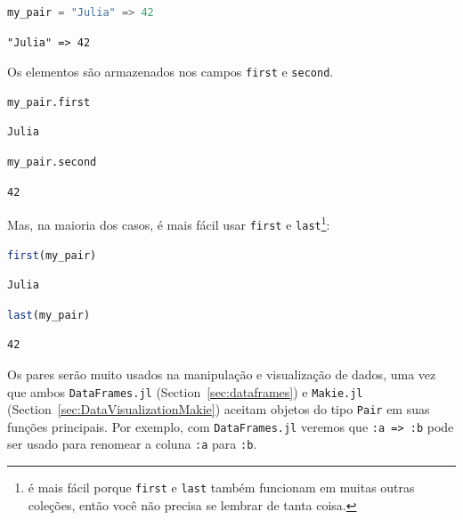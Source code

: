 \documentclass[
  notoc %
]{tufte-book}
\newcommand{\passthrough}[1]{#1}
\begin{document}
\begin{lstlisting}[language=Julia]
my_pair = "Julia" => 42
\end{lstlisting}

\begin{lstlisting}[language=Output]
"Julia" => 42
\end{lstlisting}

Os elementos são armazenados nos campos \passthrough{\lstinline!first!}
e \passthrough{\lstinline!second!}.

\begin{lstlisting}[language=Julia]
my_pair.first
\end{lstlisting}

\begin{lstlisting}[language=Output]
Julia
\end{lstlisting}

\begin{lstlisting}[language=Julia]
my_pair.second
\end{lstlisting}

\begin{lstlisting}[language=Output]
42
\end{lstlisting}

Mas, na maioria dos casos, é mais fácil usar
\passthrough{\lstinline!first!} e
\passthrough{\lstinline!last!}\footnote{é mais fácil porque
  \passthrough{\lstinline!first!} e \passthrough{\lstinline!last!}
  também funcionam em muitas outras coleções, então você não precisa se
  lembrar de tanta coisa.}:

\begin{lstlisting}[language=Julia]
first(my_pair)
\end{lstlisting}

\begin{lstlisting}[language=Output]
Julia
\end{lstlisting}

\begin{lstlisting}[language=Julia]
last(my_pair)
\end{lstlisting}

\begin{lstlisting}[language=Output]
42
\end{lstlisting}

Os pares serão muito usados na manipulação e visualização de dados, uma
vez que ambos \passthrough{\lstinline!DataFrames.jl!}
(Section~\ref{sec:dataframes}) e \passthrough{\lstinline!Makie.jl!}
(Section~\ref{sec:DataVisualizationMakie}) aceitam objetos do tipo
\passthrough{\lstinline!Pair!} em suas funções principais. Por exemplo,
com \passthrough{\lstinline!DataFrames.jl!} veremos que
\passthrough{\lstinline!:a => :b!} pode ser usado para renomear a coluna
\passthrough{\lstinline!:a!} para \passthrough{\lstinline!:b!}.
\end{document}
